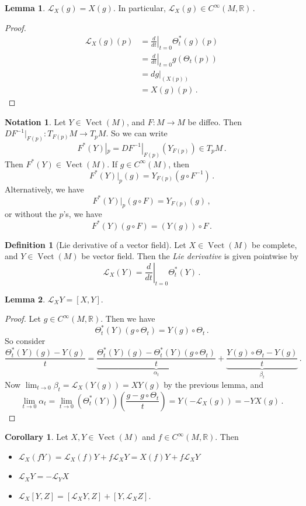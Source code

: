 \documentclass[a4paper,11pt]{article}
\theoremstyle{definition}
\newtheorem*{defn}{Definition}
\newtheorem*{lem}{Lemma}
\newtheorem*{cor}{Corollary}
\newtheorem*{notn}{Notation}
\DeclareMathOperator{\Vect}{Vect}
\numberwithin{equation}{section}
\begin{document}
\begin{lem}
$\mathcal{L}_X(g)=X(g)$. In particular, $\mathcal{L}_X(g)\in C^\infty(M,\mathbb{R})$\,.
\end{lem}
\begin{proof}
\begin{align*}
    \mathcal{L}_X(g)(p)&=\left.\frac{d}{dt}\right|_{t=0}\Theta^*_t(g)(p)\\
    &=\left.\frac{d}{dt}\right|_{t=0}g(\Theta_t(p))\\
    &=dg|_(X(p))\\
    &=X(g)(p)\,.
\end{align*}
\end{proof}

\begin{notn}
Let $Y\in\Vect(M)$, and $F:M\rightarrow M$ be diffeo. Then $DF^{-1}|_{F(p)}:T_{F(p)}M\rightarrow T_p M$. So we can write
\[
F^*(Y)|_p=DF^{-1}|_{F(p)}(Y_{F(p)})\in T_pM\,.
\]
Then $F^*(Y)\in\Vect(M)$. If $g\in C^\infty(M)$, then 
\[
F^*(Y)|_p(g)=Y_{F(p)}(g\circ F^{-1})\,.
\]
Alternatively, we have 
\[
F^*(Y)|_p(g\circ F)=Y_{F(p)}(g)\,,
\]
or without the $p$'s, we have
\[
F^*(Y)(g\circ F)=(Y(g))\circ F\,.
\]
\end{notn}

\begin{defn}[Lie derivative of a vector field]
Let $X\in\Vect(M)$ be complete, and $Y\in\Vect(M)$ be vector field. Then the \emph{Lie derivative} is given pointwise by
\[
\mathcal{L}_X(Y)=\left.\frac{d}{dt}\right|_{t=0}\Theta^*_t(Y)\,.
\]
\end{defn}

\begin{lem}
$\mathcal{L}_XY=[X,Y]$.
\end{lem}

\begin{proof}
Let $g\in C^\infty(M,\mathbb{R})$. Then we have
\[
\Theta^*_t(Y)(g\circ\Theta_t)=Y(g)\circ\Theta_t\,.
\]
So consider
\[
\frac{\Theta^*_t(Y)(g)-Y(g)}{t}=\underbrace{\frac{\Theta^*_t(Y)(g)-\Theta^*_t(Y)(g\circ\Theta_t)}{t}}_{\alpha_t}+\underbrace{\frac{Y(g)\circ\Theta_t-Y(g)}{t}}_{\beta_t}\,.
\]
Now $\lim_{t\rightarrow0}\beta_t=\mathcal{L}_X(Y(g))=XY(g)$ by the previous lemma, and
\[
\lim_{t\rightarrow0}\alpha_t=\lim_{t\rightarrow0}(\Theta^*_t(Y))\left(\frac{g-g\circ\Theta_t}{t}\right)=Y(-\mathcal{L}_X(g))=-YX(g)\,.
\]
\end{proof}

\begin{cor}
Let $X,Y\in\Vect(M)$ and $f\in C^\infty(M,\mathbb{R})$. Then
\begin{itemize}
    \item $\mathcal{L}_X(fY)=\mathcal{L}_X(f)Y+f\mathcal{L}_XY=X(f)Y+f\mathcal{L}_XY$
    \item $\mathcal{L}_XY=-\mathcal{L}_YX$
    \item $\mathcal{L}_X[Y,Z]=[\mathcal{L}_XY,Z]+[Y,\mathcal{L}_XZ]$.
\end{itemize}
\end{cor}
\end{document}
